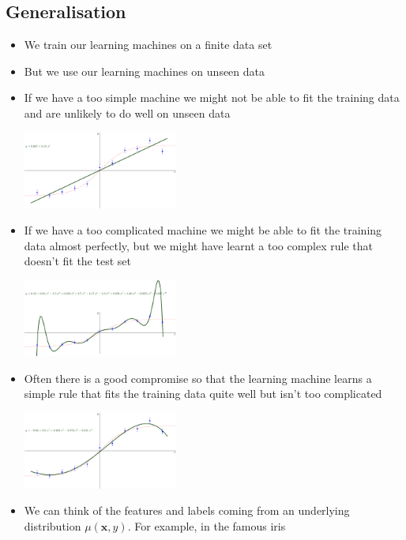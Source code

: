 \documentclass[11pt]{article}
\begin{document}
\subsection{Generalisation}
\label{sec:orgfef80dc}
\begin{itemize}
\item We train our learning machines on a finite data set
\item But we use our learning machines on unseen data
\item If we have a too simple machine we might not be able to fit the
training data and are unlikely to do well on unseen data
\begin{center}
\includegraphics[width=0.4\textwidth]{figures/curveFitting-1.pdf}
\end{center}
\item If we have a too complicated machine we might be able to fit the
training data almost perfectly, but we might have learnt a too
complex rule that doesn't fit the test set
\begin{center}
\includegraphics[width=0.4\textwidth]{figures/curveFitting-3.pdf}
\end{center}
\item Often there is a good compromise so that the learning machine
learns a simple rule that fits the training data quite well but
isn't too complicated
\begin{center}
\includegraphics[width=0.4\textwidth]{figures/curveFitting-2.pdf}
\end{center}
\item We can think of the features and labels coming from an underlying
distribution \(\mu(\bm{x},y)\).  For example, in the famous iris

\end{itemize}
\end{document}
